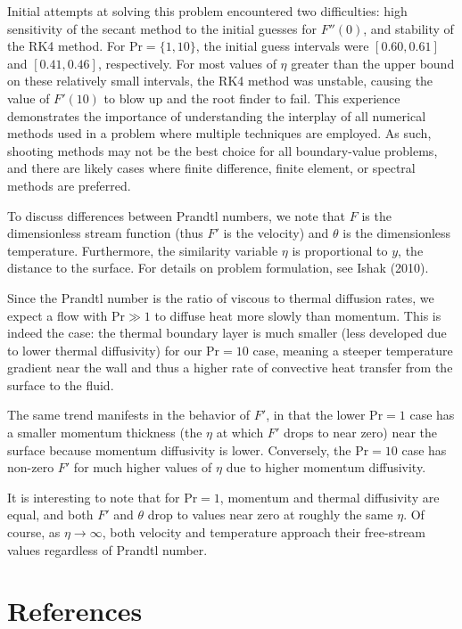 \documentclass[12pt]{article}
\begin{document}
Initial attempts at solving this problem encountered two difficulties: high sensitivity of the secant method to the initial guesses for $F''(0)$, and stability of the RK4 method. For $\text{Pr} = \{1, 10\}$, the initial guess intervals were $[0.60, 0.61]$ and $[0.41, 0.46]$, respectively. For most values of $\eta$ greater than the upper bound on these relatively small intervals, the RK4 method was unstable, causing the value of $F'(10)$ to blow up and the root finder to fail. This experience demonstrates the importance of understanding the interplay of all numerical methods used in a problem where multiple techniques are employed. As such, shooting methods may not be the best choice for all boundary-value problems, and there are likely cases where finite difference, finite element, or spectral methods are preferred.

To discuss differences between Prandtl numbers, we note that $F$ is the dimensionless stream function (thus $F'$ is the velocity) and $\theta$ is the dimensionless temperature. Furthermore, the similarity variable $\eta$ is proportional to $y$, the distance to the surface. For details on problem formulation, see Ishak (2010).

Since the Prandtl number is the ratio of viscous to thermal diffusion rates, we expect a flow with $\text{Pr} \gg 1$ to diffuse heat more slowly than momentum. This is indeed the case: the thermal boundary layer is much smaller (less developed due to lower thermal diffusivity) for our $\text{Pr} = 10$ case, meaning a steeper temperature gradient near the wall and thus a higher rate of convective heat transfer from the surface to the fluid.

The same trend manifests in the behavior of $F'$, in that the lower $\text{Pr} = 1$ case has a smaller momentum thickness (the $\eta$ at which $F'$ drops to near zero) near the surface because momentum diffusivity is lower. Conversely, the $\text{Pr} = 10$ case has non-zero $F'$ for much higher values of $\eta$ due to higher momentum diffusivity.

It is interesting to note that for $\text{Pr} = 1$, momentum and thermal diffusivity are equal, and both $F'$ and $\theta$ drop to values near zero at roughly the same $\eta$. Of course, as $\eta \rightarrow \infty$, both velocity and temperature approach their free-stream values regardless of Prandtl number.

\section{References} %
\end{document}
